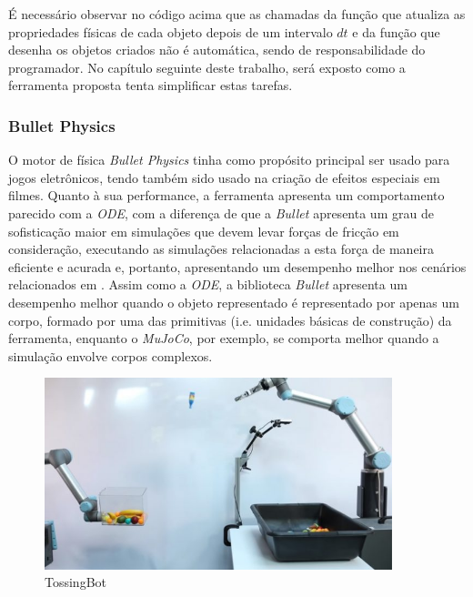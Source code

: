 \documentclass[cic,tc]{iiufrgs}
\begin{document}

É necessário observar no código acima que as chamadas da função que atualiza as
propriedades físicas de cada objeto depois de um intervalo $dt$ e da função que
desenha os objetos criados não é automática, sendo de responsabilidade do
programador. No capítulo seguinte deste trabalho, será exposto como a ferramenta
proposta tenta simplificar estas tarefas.

\subsubsection{Bullet Physics}


O motor de física \textit{Bullet Physics} \cite{BulletPhysics} tinha como
propósito principal ser usado para jogos eletrônicos, tendo também sido usado
na criação de efeitos especiais em filmes. Quanto à sua performance, a
ferramenta apresenta um comportamento parecido com a \textit{ODE}, com a
diferença de que a \textit{Bullet} apresenta um grau de sofisticação maior em
simulações que devem levar forças de fricção em consideração, executando as
simulações relacionadas a esta força de maneira eficiente e acurada e, portanto,
apresentando um desempenho melhor nos cenários relacionados em \cite{LeggedRobotics2018}.
Assim como a \textit{ODE}, a biblioteca \textit{Bullet} apresenta um desempenho melhor
quando o objeto representado é representado por apenas um corpo, formado por uma
das primitivas (i.e. unidades básicas de construção) da ferramenta, enquanto o
\textit{MuJoCo}, por exemplo, se comporta melhor quando a simulação envolve
corpos complexos.

\begin{figure}[h]
    \caption{TossingBot}
    \begin{center}
      \includegraphics[width=0.9\textwidth]{tossingbot.jpg}
    \end{center}
    \label{fig:tossingbot}
\end{figure}
\end{document}
